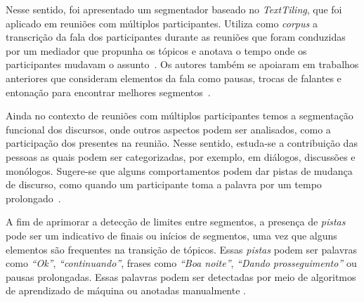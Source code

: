 Nesse sentido, foi apresentado um segmentador baseado no  \textit{TextTiling}, que foi aplicado em reuniões com múltiplos participantes. Utiliza como \textit{corpus} a transcrição da fala dos participantes durante as reuniões que foram conduzidas por um mediador que propunha os tópicos e anotava o tempo onde os participantes mudavam o assunto~\cite{Banerjee2006}. 
Os autores também se apoiaram em trabalhos anteriores que consideram elementos da fala como pausas, trocas de falantes e entonação para encontrar melhores segmentos~\cite{Galley2003}.






Ainda no contexto de reuniões com múltiplos participantes temos a segmentação funcional dos discursos, onde outros aspectos podem ser analisados, como a participação dos presentes na reunião. Nesse sentido, estuda-se a contribuição das pessoas as quais podem ser categorizadas,  por exemplo, em diálogos, discussões e monólogos. Sugere-se que alguns comportamentos podem dar pistas de mudança de discurso, como quando um participante toma a palavra por um tempo prolongado~\cite{Bokaei2015}. 


%

A fim de aprimorar a detecção de limites entre segmentos, a presença de \textit{pistas} pode ser um indicativo de finais ou inícios de segmentos, uma vez que alguns elementos são frequentes na transição de tópicos. Essas \textit{pistas} podem ser palavras como \textit{``Ok''}, \textit{``continuando''}, frases como \textit{``Boa noite''}, \textit{``Dando prosseguimento''} ou pausas prolongadas. Essas palavras podem ser detectadas por meio de algoritmos de aprendizado de máquina ou anotadas manualmente
\cite{Hsueh2006} %
\cite{Galley2003} 
\cite{Beeferman1999}
.


